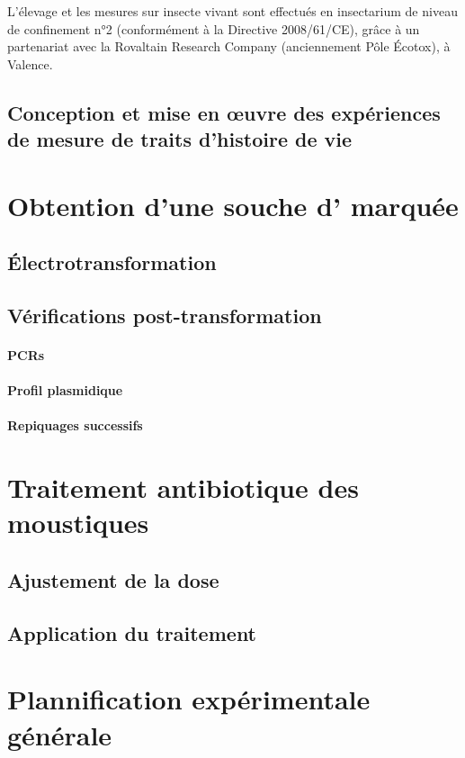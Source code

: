 L'élevage et les mesures sur insecte vivant sont effectués en insectarium de niveau de confinement n°2 (conformément à la Directive 2008/61/CE), grâce à un partenariat avec la Rovaltain Research Company (anciennement Pôle Écotox), à Valence.

\subsection{Conception et mise en œuvre des expériences de mesure de traits d'histoire de vie}

\section{Obtention d'une souche d' marquée}

\subsection{Électrotransformation}

\subsection{Vérifications post-transformation}

\paragraph{PCRs}
\paragraph{Profil plasmidique}
\paragraph{Repiquages successifs}

\section{Traitement antibiotique des moustiques}

\subsection{Ajustement de la dose}

\subsection{Application du traitement}

\section{Plannification expérimentale générale}